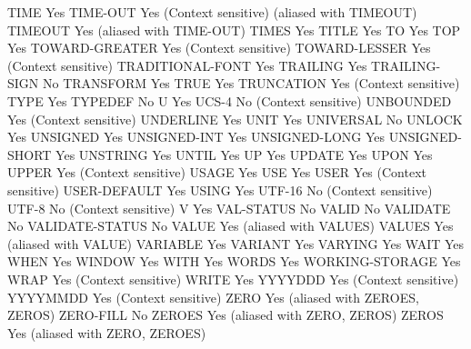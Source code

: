 TIME                            Yes
TIME-OUT                        Yes (Context sensitive) (aliased with TIMEOUT)
TIMEOUT                         Yes (aliased with TIME-OUT)
TIMES                           Yes
TITLE                           Yes
TO                              Yes
TOP                             Yes
TOWARD-GREATER                  Yes (Context sensitive)
TOWARD-LESSER                   Yes (Context sensitive)
TRADITIONAL-FONT                Yes
TRAILING                        Yes
TRAILING-SIGN                   No
TRANSFORM                       Yes
TRUE                            Yes
TRUNCATION                      Yes (Context sensitive)
TYPE                            Yes
TYPEDEF                         No
U                               Yes
UCS-4                           No (Context sensitive)
UNBOUNDED                       Yes (Context sensitive)
UNDERLINE                       Yes
UNIT                            Yes
UNIVERSAL                       No
UNLOCK                          Yes
UNSIGNED                        Yes
UNSIGNED-INT                    Yes
UNSIGNED-LONG                   Yes
UNSIGNED-SHORT                  Yes
UNSTRING                        Yes
UNTIL                           Yes
UP                              Yes
UPDATE                          Yes
UPON                            Yes
UPPER                           Yes (Context sensitive)
USAGE                           Yes
USE                             Yes
USER                            Yes (Context sensitive)
USER-DEFAULT                    Yes
USING                           Yes
UTF-16                          No (Context sensitive)
UTF-8                           No (Context sensitive)
V                               Yes
VAL-STATUS                      No
VALID                           No
VALIDATE                        No
VALIDATE-STATUS                 No
VALUE                           Yes (aliased with VALUES)
VALUES                          Yes (aliased with VALUE)
VARIABLE                        Yes
VARIANT                         Yes
VARYING                         Yes
WAIT                            Yes
WHEN                            Yes
WINDOW                          Yes
WITH                            Yes
WORDS                           Yes
WORKING-STORAGE                 Yes
WRAP                            Yes (Context sensitive)
WRITE                           Yes
YYYYDDD                         Yes (Context sensitive)
YYYYMMDD                        Yes (Context sensitive)
ZERO                            Yes (aliased with ZEROES, ZEROS)
ZERO-FILL                       No
ZEROES                          Yes (aliased with ZERO, ZEROS)
ZEROS                           Yes (aliased with ZERO, ZEROES)

